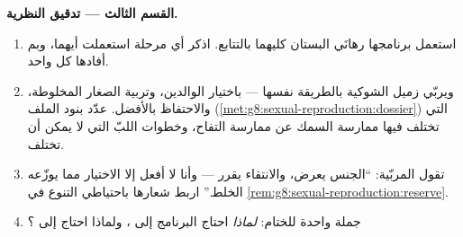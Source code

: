 \begin{problem}
\medskip\noindent\textbf{القسم الثالث --- تدقيق
النظرية.}
\begin{enumerate}[resume]
  \item استعمل برنامجها رهانَي البستان كليهما بالتتابع. اذكر أي
        مرحلة استعملت أيهما، وبم أفادها كل واحد.
  \item ويربّي زميل  الشوكية بالطريقة نفسها --- باختيار
        الوالدين، وتربية الصغار المخلوطة، والاحتفاظ بالأفضل.
        عدّد بنود الملف
        (\cref{met:g8:sexual-reproduction:dossier}) التي تختلف
        فيها ممارسة السمك عن ممارسة التفاح، وخطوات اللبّ التي
        لا يمكن أن تختلف.
  \item تقول المربّية: ``الجنس يعرض، والانتقاء يقرر --- وأنا لا
        أفعل إلا الاختيار مما يوزّعه الخلط.'' اربط شعارها
        باحتياطي التنوع في
        \cref{rem:g8:sexual-reproduction:reserve}.
  \item جملة واحدة للختام: \emph{لماذا} احتاج البرنامج إلى
        ، ولماذا احتاج إلى ؟
\end{enumerate}
\end{problem}
